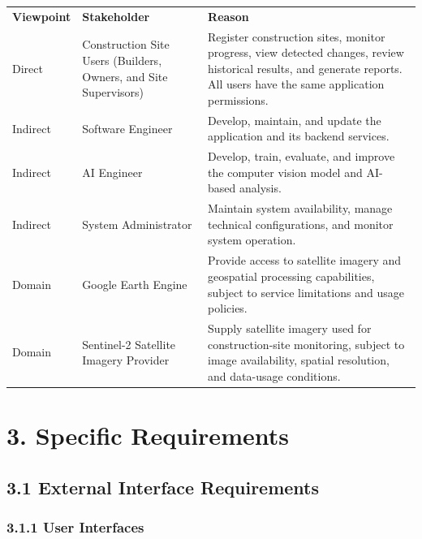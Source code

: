 \documentclass[12pt,a4paper]{report}
\newcommand{\chapterlabel}{}
\begin{document}
\begin{longtable}[]{@{}
  >{\raggedright\arraybackslash}p{}
  >{\raggedright\arraybackslash}p{}
  >{\raggedright\arraybackslash}p{}@{}}
\toprule\noalign{}
\endhead
\bottomrule\noalign{}
\endlastfoot
\textbf{Viewpoint} & \textbf{Stakeholder} & \textbf{Reason} \\
Direct & Construction Site Users (Builders, Owners, and Site
Supervisors) & Register construction sites, monitor progress, view
detected changes, review historical results, and generate reports. All
users have the same application permissions. \\
Indirect & Software Engineer & Develop, maintain, and update the
application and its backend services. \\
Indirect & AI Engineer & Develop, train, evaluate, and improve the
computer vision model and AI-based analysis. \\
Indirect & System Administrator & Maintain system availability, manage
technical configurations, and monitor system operation. \\
Domain & Google Earth Engine & Provide access to satellite imagery and
geospatial processing capabilities, subject to service limitations and
usage policies. \\
Domain & Sentinel-2 Satellite Imagery Provider & Supply satellite
imagery used for construction-site monitoring, subject to image
availability, spatial resolution, and data-usage conditions. \\
\end{longtable}

\renewcommand{\chapterlabel}{Chapter 3}
\chapter{3. Specific Requirements}\label{specific-requirements}

\section{3.1 External Interface
Requirements}\label{external-interface-requirements}

\subsection{3.1.1 User Interfaces}\label{user-interfaces}
\end{document}
